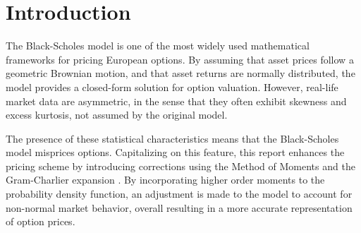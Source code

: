 
\section{Introduction}
\label{sec: intro}

The Black-Scholes model \cite{black1973pricing} is one of the most widely used mathematical frameworks for pricing European options. By assuming that asset prices follow a geometric Brownian motion, and that asset returns are normally distributed, the model provides a closed-form solution for option valuation. However, real-life market data are asymmetric, in the sense that they often exhibit skewness and excess kurtosis, not assumed by the original model.

The presence of these statistical characteristics means that the Black-Scholes model misprices options. Capitalizing on this feature, this report enhances the pricing scheme by introducing corrections using the Method of Moments and the Gram-Charlier expansion \cite{wallace1958asymptotic}. By incorporating higher order moments to the probability density function, an adjustment is made to the model to account for non-normal market behavior, overall resulting in a more accurate representation of option prices.

